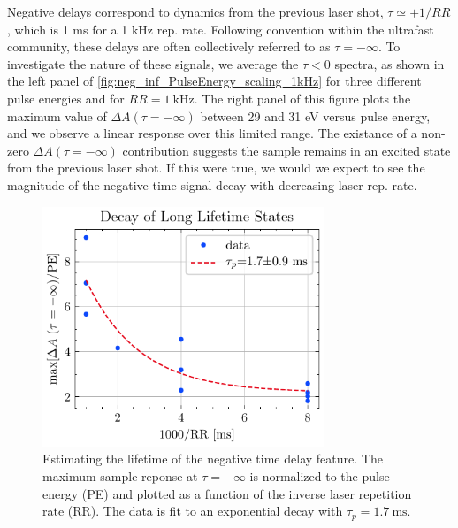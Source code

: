 Negative delays correspond to dynamics from the previous laser shot, $\tau \simeq +1/RR$, which is 1 ms for a 1 kHz rep. rate. Following convention within the ultrafast community, these delays are often collectively referred to as $\tau = -\infty$. To investigate the nature of these signals, we average the $\tau < 0$ spectra, as shown in the left panel of \cref{fig:neg_inf_PulseEnergy_scaling_1kHz} for three different pulse energies and for $RR = 1 \ \textrm{kHz}$. The right panel of this figure plots the maximum value of $\Delta A(\tau=-\infty)$ between 29 and 31 eV versus pulse energy, and we observe a linear response over this limited range. The existance of a non-zero $\Delta A(\tau=-\infty)$ contribution suggests the sample remains in an excited state from the previous laser shot. If this were true, we would we expect to see the magnitude of the negative time signal decay with decreasing laser rep. rate.

\begin{figure}
	\centering
	\includegraphics[width=0.75\textwidth]{figures/chap4/long_lifetime_states_PulseEnergy.pdf}
	\caption{Estimating the lifetime of the negative time delay feature. The maximum sample reponse at $\tau = -\infty$ is normalized to the pulse energy (PE) and plotted as a function of the inverse laser repetition rate (RR). The data is fit to an exponential decay with $\tau_p = 1.7 \ \textrm{ms}$.}
	\label{fig:long_lifetime_states}
\end{figure}

